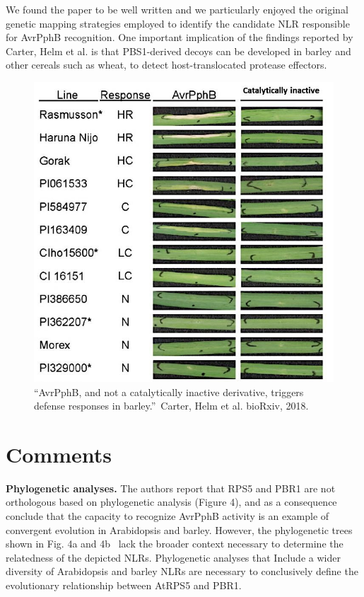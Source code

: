 \documentclass[10pt]{article}
\begin{document}
We found the paper to be well written and we particularly enjoyed the
original genetic mapping strategies employed to identify the candidate
NLR responsible for AvrPphB recognition. One important implication of
the findings reported by Carter, Helm et al. is that PBS1-derived decoys
can be developed in barley and other cereals such as wheat, to detect
host-translocated protease effectors.
\begin{figure}[h!]
\begin{center}
\includegraphics[width=0.70\columnwidth]{figures/AvrPphBcatalytically-inactive-705x705/AvrPphBcatalytically-inactive-705x705}
\caption{{``AvrPphB, and not a catalytically inactive derivative, triggers defense
responses in barley.''~Carter, Helm et al. bioRxiv, 2018.%
}}
\end{center}
\end{figure}

\section*{\(\)Comments}

{\label{457509}}\par\null

\textbf{Phylogenetic analyses.} The authors report that RPS5 and PBR1
are not orthologous based on phylogenetic analysis (Figure 4), and as a
consequence conclude that the capacity to recognize AvrPphB activity is
an example of convergent evolution in Arabidopsis and barley. However,
the phylogenetic trees shown in Fig. 4a and 4b~ lack the broader context
necessary to determine the relatedness of the depicted NLRs.
Phylogenetic analyses that Include a wider diversity of Arabidopsis and
barley NLRs are necessary to conclusively define the evolutionary
relationship between AtRPS5 and PBR1.
\end{document}

